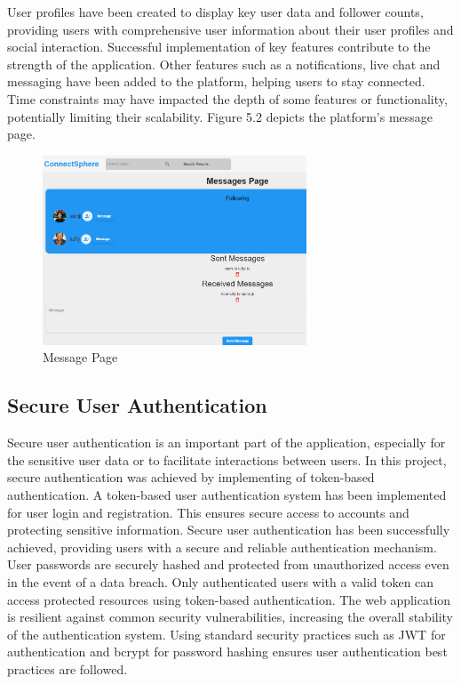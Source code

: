 User profiles have been created to display key user data and follower counts, providing users with comprehensive user information about their user profiles and social interaction. Successful implementation of key features contribute to the strength of the application. Other features such as a notifications, live chat and messaging have been added to the platform, helping users to stay connected. Time constraints may have impacted the depth of some features or functionality, potentially limiting their scalability. Figure 5.2 depicts the platform's message page.

\begin{figure}[h!]
    \centering
    \includegraphics[width=0.7\textwidth]{images/message.PNG}
    \caption{Message Page}
    \label{fig:message-page}
\end{figure}

\subsection{Secure User Authentication}
Secure user authentication is an important part of the application, especially for the sensitive user data or to facilitate interactions between users. In this project, secure authentication was achieved by implementing of token-based authentication. A token-based user authentication system has been implemented for user login and registration. This ensures secure access to accounts and protecting sensitive information. Secure user authentication has been successfully achieved, providing users with a secure and reliable authentication mechanism. User passwords are securely hashed and protected from unauthorized access even in the event of a data breach. Only authenticated users with a valid token can access protected resources using token-based authentication. The web application is resilient against common security vulnerabilities, increasing the overall stability of the authentication system. Using
standard security practices such as JWT for authentication and bcrypt for password hashing ensures user authentication best practices are followed.

